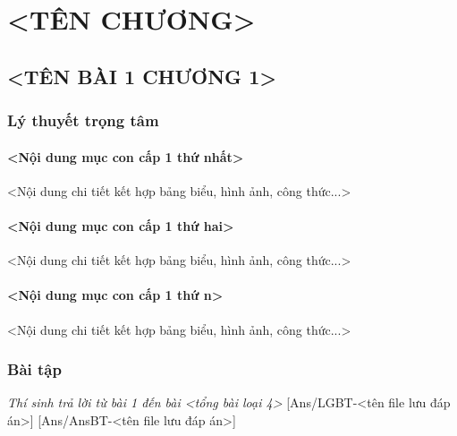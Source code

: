 \documentclass[Main.tex]{subfiles}
\begin{document}
\chapter{<TÊN CHƯƠNG>}
\begin{Muctieu}
    \item <Nội dung mục tiêu 1 cần đạt trong chương>
    \item <Nội dung mục tiêu 2 cần đạt trong chương>
\end{Muctieu}

\section{<TÊN BÀI 1 CHƯƠNG 1>}

\subsection{Lý thuyết trọng tâm}
\begin{kienthuccannho}
    \subsubsection{<Nội dung mục con cấp 1 thứ nhất>}
    <Nội dung chi tiết kết hợp bảng biểu, hình ảnh, công thức...>

    \subsubsection{<Nội dung mục con cấp 1 thứ hai>}
    <Nội dung chi tiết kết hợp bảng biểu, hình ảnh, công thức...>

    \subsubsection{<Nội dung mục con cấp 1 thứ n>}
    <Nội dung chi tiết kết hợp bảng biểu, hình ảnh, công thức...>
\end{kienthuccannho}

\subsection{Bài tập}

\textit{\large Thí sinh trả lời từ bài 1 đến bài <tổng bài loại 4>}
[Ans/LGBT-<tên file lưu đáp án>]
[Ans/AnsBT-<tên file lưu đáp án>]
\end{document}
